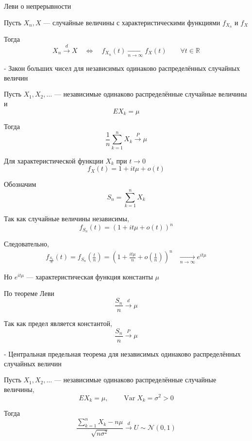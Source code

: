 \documentclass[12pt,a4paper]{article}
\begin{document}
\begin{theorem}{Леви о непрерывности}

Пусть $X_n,X$ --- случайные величины с характеристическими функциями
$f_{X_n}$ и $f_X$

Тогда
\[
X_n\xrightarrow{d}X
\quad\Longleftrightarrow\quad
f_{X_n}(t)\xrightarrow[n\to\infty]{}f_X(t)
\qquad
\forall t\in\mathbb{R}
\]

\end{theorem}

\begin{theorem}{- Закон больших чисел для независимых одинаково распределённых случайных величин}

Пусть $X_1,X_2,\ldots$ --- независимые одинаково распределённые случайные величины и
\[
EX_k=\mu
\]

Тогда
\[
\frac{1}{n}\sum_{k=1}^nX_k
\xrightarrow{P}
\mu
\]

\end{theorem}

\begin{proofbox}{}

Для характеристической функции $X_k$ при $t\to0$
\[
f_X(t)
=
1+it\mu+o(t)
\]

Обозначим
\[
S_n=\sum_{k=1}^nX_k
\]

Так как случайные величины независимы,
\[
f_{S_n}(t)
=
\left(1+it\mu+o(t)\right)^n
\]

Следовательно,
\[
\begin{aligned}
f_{\frac{S_n}{n}}(t)
=
f_{S_n}\left(\frac{t}{n}\right)
=
\left(
1+\frac{it\mu}{n}
+
o\left(\frac{1}{n}\right)
\right)^n
&\xrightarrow[n\to\infty]{}
e^{it\mu}
\end{aligned}
\]

Но $e^{it\mu}$ --- характеристическая функция константы $\mu$

По теореме Леви
\[
\frac{S_n}{n}
\xrightarrow{d}
\mu
\]

Так как предел является константой,
\[
\frac{S_n}{n}
\xrightarrow{P}
\mu
\]

\end{proofbox}

\begin{theorem}{- Центральная предельная теорема для независимых одинаково распределённых случайных величин}

Пусть $X_1,X_2,\ldots$ --- независимые одинаково распределённые случайные величины,
\[
EX_k=\mu,
\qquad
\operatorname{Var}X_k=\sigma^2>0
\]

Тогда
\[
\frac{\sum_{k=1}^nX_k-n\mu}
{\sqrt{n\sigma^2}}
\xrightarrow{d}
U\sim\mathcal{N}(0,1)
\]

\end{theorem}
\end{document}
